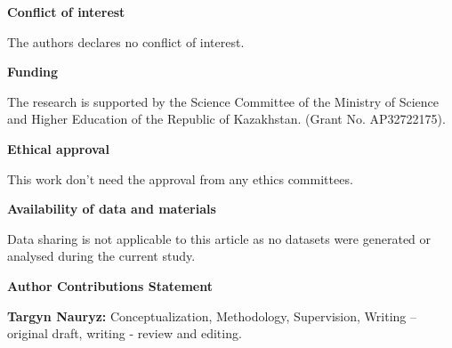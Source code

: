 \documentclass[preprint,12pt,authoryear]{elsarticle}
\begin{document}
\textbf{Conflict of interest}

The authors declares no conflict of interest.

\textbf{Funding}

The research is supported by the Science Committee of the Ministry of Science and Higher Education of the Republic of Kazakhstan. (Grant No. AP32722175).

\textbf{Ethical approval}

This work don't need the approval from any ethics committees.

\textbf{Availability of data and materials}

Data sharing is not applicable to this article as no datasets were generated or analysed during the current study.

\textbf{Author Contributions Statement}

\textbf{Targyn Nauryz:} Conceptualization, Methodology, Supervision, Writing – original draft, writing - review and editing.
\end{document}
